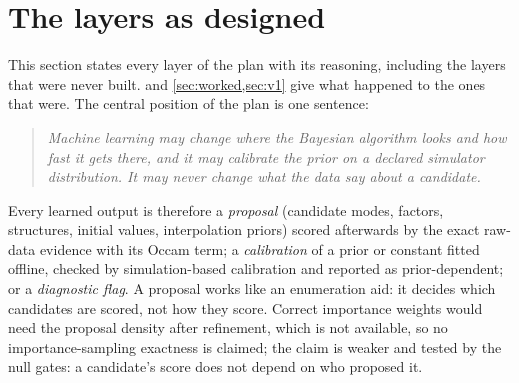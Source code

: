 \section{The layers as designed}\label{sec:design}
This section states every layer of the plan with its reasoning, including the layers that were never built.  and \cref{sec:worked,sec:v1} give what happened to the ones that were.
The central position of the plan is one sentence:
\begin{quote}\emph{Machine learning may change where the Bayesian algorithm looks and how fast it gets there, and it may calibrate the prior on a declared simulator distribution. It may never change what the data say about a candidate.}\end{quote}
Every learned output is therefore a \emph{proposal} (candidate modes, factors, structures, initial values, interpolation priors) scored afterwards by the exact raw-data evidence with its Occam term; a \emph{calibration} of a prior or constant fitted offline, checked by simulation-based calibration and reported as prior-dependent; or a \emph{diagnostic flag}.
A proposal works like an enumeration aid: it decides which candidates are scored, not how they score. Correct importance weights would need the proposal density after refinement, which is not available, so no importance-sampling exactness is claimed; the claim is weaker and tested by the null gates: a candidate's score does not depend on who proposed it.

